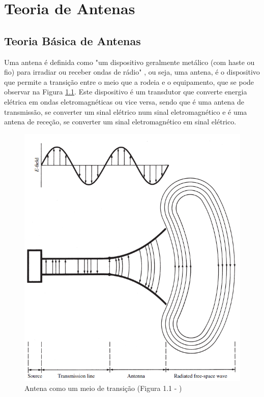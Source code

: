 
\chapter{Teoria de Antenas} %
\label{chap:Chapter3} %

\section{Teoria Básica de Antenas}
Uma antena é definida como "um dispositivo geralmente metálico (com haste ou fio) para irradiar ou receber ondas de rádio" \parencite{Balanis2016}, ou seja, uma antena, é o dispositivo que permite a transição entre o meio que a rodeia e o equipamento, que se pode observar na Figura \ref{fig:antena transicao}. 
Este dispositivo é um transdutor que converte energia elétrica em ondas eletromagnéticas ou vice versa, sendo que é uma antena de transmissão, se converter um sinal elétrico num sinal eletromagnético e é uma antena de receção, se converter um sinal eletromagnético em sinal elétrico. 

\begin{figure}[h]
\centering
\includegraphics[scale=0.6]{chapters/ch3/assets/Antenna_transicao}
\caption[Antena como meio de transição]{Antena como um meio de transição (Figura 1.1 - \cite{Balanis2016})}
\label{fig:antena transicao}
\end{figure}


